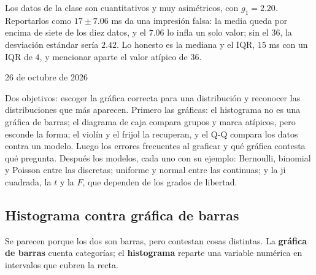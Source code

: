 \documentclass[11pt,letterpaper]{article}
\begin{document}
\begin{idea}
    Los datos de la clase son cuantitativos y muy asimétricos, con
    $g_1 = 2.20$. Reportarlos como $17 \pm 7.06$ ms da una impresión
    falsa: la media queda por encima de siete de los diez datos, y el
    $7.06$ lo infla un solo valor; sin el $36$, la desviación estándar
    sería $2.42$. Lo honesto es la mediana y el IQR, $15$ ms con un IQR
    de $4$, y mencionar aparte el valor atípico de $36$.
\end{idea}


\newpage

%
{26 de octubre de 2026}

\begin{quick_sum}
    Dos objetivos: escoger la gráfica correcta para una distribución y
    reconocer las distribuciones que más aparecen. Primero las gráficas:
    el histograma no es una gráfica de barras; el diagrama de caja
    compara grupos y marca atípicos, pero esconde la forma; el violín
    y el frijol la recuperan, y el Q-Q compara los datos contra un
    modelo. Luego los errores frecuentes al graficar y qué gráfica
    contesta qué pregunta. Después los modelos, cada uno con su
    ejemplo: Bernoulli, binomial y Poisson entre las discretas;
    uniforme y normal entre las continuas; y la ji cuadrada, la $t$ y
    la $F$, que dependen de los grados de libertad.
\end{quick_sum}

\subsection*{Histograma contra gráfica de barras}

Se parecen porque los dos son barras, pero contestan cosas distintas.
La \textbf{gráfica de barras} cuenta categorías; el
\textbf{histograma} reparte una variable numérica en intervalos que
cubren la recta.
\end{document}
